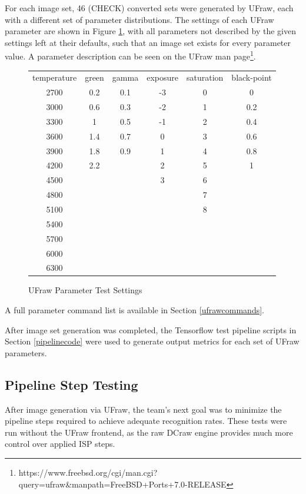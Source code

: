 \documentclass{report}
\begin{document}
		For each image set, 46 (CHECK) converted sets were generated by UFraw, each with a different set of parameter distributions. The settings of each UFraw parameter are shown in Figure \ref{ufraw_settings}, with all parameters not described by the given settings left at their defaults, such that an image set exists for every parameter value. A parameter description can be seen on the UFraw man page\footnote{https://www.freebsd.org/cgi/man.cgi?query=ufraw\&manpath=FreeBSD+Ports+7.0-RELEASE}.
		
		\begin{figure}
			\begin{center}
				\label{ufraw_settings}
				\caption{UFraw Parameter Test Settings}
				\begin{tabular}{cccccc}
					temperature & green & gamma & exposure & saturation & black-point \\
					2700 & 0.2 & 0.1 & -3 & 0 & 0 \\
					3000 & 0.6 & 0.3 & -2 & 1 & 0.2 \\
					3300 & 1 & 0.5 & -1 & 2 & 0.4 \\
					3600 & 1.4 & 0.7 & 0 & 3 & 0.6 \\
					3900 & 1.8 & 0.9 & 1 & 4 & 0.8 \\
					4200 & 2.2 && 2 & 5 & 1 \\
					4500 &&& 3 & 6 & \\
					4800 &&&& 7 & \\
					5100 &&&& 8 & \\
					5400 &&&&& \\
					5700 &&&&& \\
					6000 &&&&& \\
					6300 &&&&& \\
				\end{tabular}	
			\end{center}
		\end{figure}
	
		A full parameter command list is available in Section \ref{ufrawcommands}.
		
		After image set generation was completed, the Tensorflow test pipeline scripts in Section \ref{pipelinecode} were used to generate output metrics for each set of UFraw parameters.
		
		\subsection{Pipeline Step Testing}
		After image generation via UFraw, the team's next goal was to minimize the pipeline steps required to achieve adequate recognition rates. These tests were run without the UFraw frontend, as the raw DCraw engine provides much more control over applied ISP steps.
		
\end{document}
